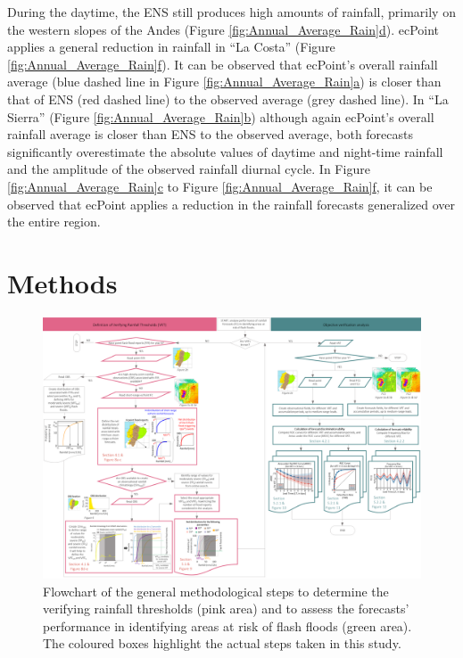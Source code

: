 \documentclass[techmemo]{ecmwfrep}%
\begin{document}
During the daytime, the ENS still produces high amounts of rainfall, primarily on the western slopes of the Andes (Figure \ref{fig:Annual_Average_Rain}\hyperref[fig:Annual_Average_Rain]{d}). ecPoint applies a general reduction in rainfall in “La Costa” (Figure \ref{fig:Annual_Average_Rain}\hyperref[fig:Annual_Average_Rain]{f}). It can be observed that ecPoint’s overall rainfall average (blue dashed line in Figure \ref{fig:Annual_Average_Rain}\hyperref[fig:Annual_Average_Rain]{a}) is closer than that of ENS (red dashed line) to the observed average (grey dashed line). In “La Sierra” (Figure \ref{fig:Annual_Average_Rain}\hyperref[fig:Annual_Average_Rain]{b}) although again ecPoint’s overall rainfall average is closer than ENS to the observed average, both forecasts significantly overestimate the absolute values of daytime and night-time rainfall and the amplitude of the observed rainfall diurnal cycle. In Figure \ref{fig:Annual_Average_Rain}\hyperref[fig:Annual_Average_Rain]{c} to Figure \ref{fig:Annual_Average_Rain}\hyperref[fig:Annual_Average_Rain]{f}, it can be observed that ecPoint applies a reduction in the rainfall forecasts generalized over the entire region. 



\section{Methods}
\label{sec:Methods}

\begin{figure}
\centering
\includegraphics[width=1.3\textwidth, angle=90]{Figures/07_METHODS_Flow_Chart.png}
\caption{Flowchart of the general methodological steps to determine the verifying rainfall thresholds (pink area) and to assess the forecasts’ performance in identifying areas at risk of flash floods (green area). The coloured boxes highlight the actual steps taken in this study.}
\label{fig:Flow_Chart}
\end{figure}
\end{document}
